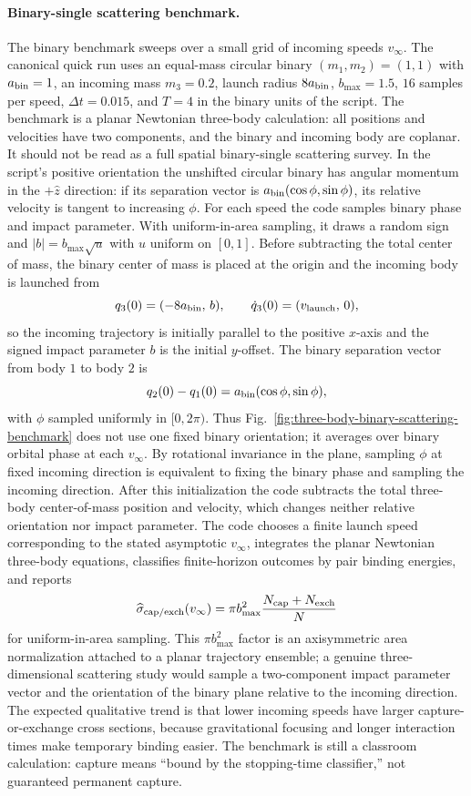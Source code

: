 \paragraph{Binary-single scattering benchmark.}
The binary benchmark sweeps over a small grid of incoming speeds
\(v_\infty\).  The canonical quick run uses an equal-mass circular binary
\((m_1,m_2)=(1,1)\) with \(a_{\rm bin}=1\), an incoming mass \(m_3=0.2\), launch
radius \(8a_{\rm bin}\), \(b_{\max}=1.5\), \(16\) samples per speed,
\(\Delta t=0.015\), and \(T=4\) in the binary units of the script.  The
benchmark is a planar Newtonian three-body calculation: all positions and
velocities have two components, and the binary and incoming body are coplanar.
It should not be read as a full spatial binary-single scattering survey.  In
the script's positive orientation the unshifted circular binary
has angular momentum in the \(+\hat z\) direction: if its separation vector is
\(a_{\rm bin}(\cos\phi,\sin\phi)\), its relative velocity is tangent to
increasing \(\phi\).  For each speed the code samples binary phase and impact
parameter.  With uniform-in-area sampling, it draws a random sign and
\(|b|=b_{\max}\sqrt{u}\) with \(u\) uniform on \([0,1]\).  Before subtracting
the total center of mass, the binary center of mass is placed at the origin and
the incoming body is launched from
\[
  q_3(0)=(-8a_{\rm bin},\,b),
  \qquad
  \dot q_3(0)=(v_{\rm launch},\,0),
\]
so the incoming trajectory is initially parallel to the positive \(x\)-axis and
the signed impact parameter \(b\) is the initial \(y\)-offset.  The binary
separation vector from body \(1\) to body \(2\) is
\[
  q_2(0)-q_1(0)
  =
  a_{\rm bin}(\cos\phi,\sin\phi),
\]
with \(\phi\) sampled uniformly in \([0,2\pi)\).  Thus Fig.~\ref{fig:three-body-binary-scattering-benchmark}
does not use one fixed binary orientation; it averages over binary orbital
phase at each \(v_\infty\).  By rotational invariance in the plane, sampling
\(\phi\) at fixed incoming direction is equivalent to fixing the binary phase
and sampling the incoming direction.  After this initialization the code
subtracts the total three-body center-of-mass position and velocity, which
changes neither relative orientation nor impact parameter.  The code chooses a
finite launch speed corresponding to the stated asymptotic \(v_\infty\),
integrates the planar Newtonian three-body equations, classifies finite-horizon
outcomes by pair binding energies, and reports
\[
  \widehat\sigma_{\rm cap/exch}(v_\infty)
  =
  \pi b_{\max}^2
  \frac{N_{\rm cap}+N_{\rm exch}}{N}
\]
for uniform-in-area sampling.  This \(\pi b_{\max}^2\) factor is an
axisymmetric area normalization attached to a planar trajectory ensemble; a
genuine three-dimensional scattering study would sample a two-component impact
parameter vector and the orientation of the binary plane relative to the
incoming direction.  The expected qualitative trend is that lower incoming
speeds have larger capture-or-exchange cross sections, because gravitational
focusing and longer interaction times make temporary binding easier.  The
benchmark is still a classroom calculation: capture means
``bound by the stopping-time classifier,'' not guaranteed permanent capture.

